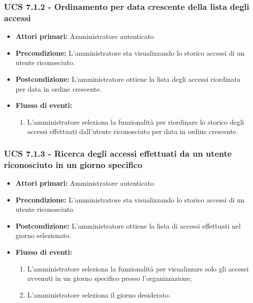 \subsubsection{UCS 7.1.2 - Ordinamento per data crescente della lista degli accessi}
\begin{itemize}
	\item \textbf{Attori primari:} Amministratore autenticato
	\item \textbf{Precondizione:} L'amministratore sta visualizzando lo storico accessi di un utente riconosciuto.
	\item \textbf{Postcondizione:} L'amministratore ottiene la lista degli accessi riordinata per data in ordine crescente.
	\item \textbf{Flusso di eventi:}
	\begin{enumerate}
		\item L'amministratore seleziona la funzionalità per riordinare lo storico degli accessi effettuati dall'utente riconosciuto per data in ordine crescente.
	\end{enumerate}
\end{itemize}

\subsubsection{UCS 7.1.3 - Ricerca degli accessi effettuati da un utente riconosciuto in un giorno specifico}
\begin{itemize}
	\item \textbf{Attori primari:} Amministratore autenticato
	\item \textbf{Precondizione:} L'amministratore sta visualizzando lo storico accessi di un utente riconosciuto.
	\item \textbf{Postcondizione:} L'amministratore ottiene la lista di accessi effettuati nel giorno selezionato.
	\item \textbf{Flusso di eventi:}
	\begin{enumerate}
		\item L'amministratore seleziona la funzionalità per visualizzare solo gli accessi avvenuti in un giorno specifico presso l'organizzazione;
		\item L'amministratore seleziona il giorno desiderato.
	\end{enumerate}  
\end{itemize}


